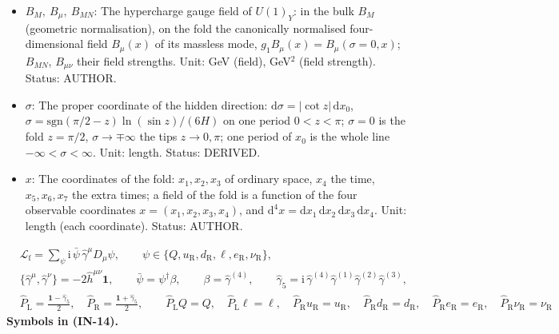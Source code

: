 \documentclass[
  10pt,
]{article}
\begin{document}
\begin{itemize}
  Status: STANDARD.
\item
  \(B_M,\ B_\mu,\ B_{MN}\): The hypercharge gauge field of \(U(1)_Y\):
  in the bulk \(B_M\) (geometric normalisation), on the fold the
  canonically normalised four-dimensional field \(B_\mu(x)\) of its
  massless mode, \(g_1B_\mu(x) = B_\mu(\sigma = 0, x)\); \(B_{MN}\),
  \(B_{\mu\nu}\) their field strengths. Unit: GeV (field), GeV\(^2\)
  (field strength). Status: AUTHOR.
\item
  \(\sigma\): The proper coordinate of the hidden direction:
  \(\mathrm{d}\sigma = \lvert\cot z\rvert\,\mathrm{d}x_0\),
  \(\sigma = \mathrm{sgn}(\pi/2 - z)\ln(\sin z)/(6H)\) on one period
  \(0 < z < \pi\); \(\sigma = 0\) is the fold \(z = \pi/2\),
  \(\sigma \to \mp\infty\) the tips \(z \to 0, \pi\); one period of
  \(x_0\) is the whole line \(-\infty < \sigma < \infty\). Unit: length.
  Status: DERIVED.
\item
  \(x\): The coordinates of the fold: \(x_1, x_2, x_3\) of ordinary
  space, \(x_4\) the time, \(x_5, x_6, x_7\) the extra times; a field of
  the fold is a function of the four observable coordinates
  \(x = (x_1, x_2, x_3, x_4)\), and
  \(\mathrm{d}^4x = \mathrm{d}x_1\,\mathrm{d}x_2\,\mathrm{d}x_3\,\mathrm{d}x_4\).
  Unit: length (each coordinate). Status: AUTHOR.
\end{itemize}

\[
\begin{aligned}
&\mathcal{L}_{\mathrm{f}} = \sum_{\psi}\mathrm{i}\,\bar\psi\,\hat\gamma^\mu D_\mu\psi,\qquad
 \psi \in \{Q, u_{\mathrm{R}}, d_{\mathrm{R}}, \ell, e_{\mathrm{R}}, \nu_{\mathrm{R}}\},\\
&\{\hat\gamma^\mu, \hat\gamma^\nu\} = -2\hat h^{\mu\nu}\mathbf{1},\qquad \bar\psi = \psi^\dagger\beta,\qquad
 \beta = \hat\gamma^{(4)},\qquad \hat\gamma_5 = \mathrm{i}\,\hat\gamma^{(4)}\hat\gamma^{(1)}\hat\gamma^{(2)}\hat\gamma^{(3)},\\
&\hat P_{\mathrm{L}} = \frac{\mathbf{1} - \hat\gamma_5}{2},\quad \hat P_{\mathrm{R}} = \frac{\mathbf{1} + \hat\gamma_5}{2},\qquad
 \hat P_{\mathrm{L}}Q = Q,\quad \hat P_{\mathrm{L}}\ell = \ell,\quad \hat P_{\mathrm{R}}u_{\mathrm{R}} = u_{\mathrm{R}},\quad
 \hat P_{\mathrm{R}}d_{\mathrm{R}} = d_{\mathrm{R}},\quad \hat P_{\mathrm{R}}e_{\mathrm{R}} = e_{\mathrm{R}},\quad
 \hat P_{\mathrm{R}}\nu_{\mathrm{R}} = \nu_{\mathrm{R}}
\end{aligned} \tag{IN-14}
\] \textbf{Symbols in (IN-14).}
\end{document}
